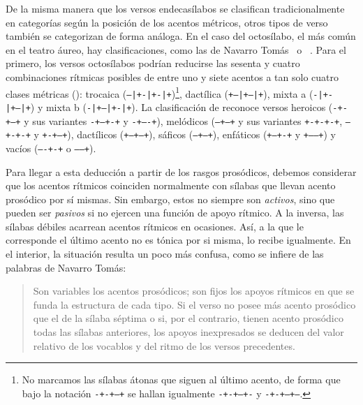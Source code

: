 De la misma manera que los versos endecasílabos se clasifican tradicionalmente en categorías según la posición de los acentos métricos, otros tipos de verso también se categorizan de forma análoga. En el caso del octosílabo, el más común en el teatro áureo, hay clasificaciones, como las de Navarro Tomás~\parencite*[64 y ss.]{navarrotomas2014a} o \citeauthor{varela2005}~\parencite*[149-158]{varela2005}. Para el primero, los versos octosílabos podrían reducirse las sesenta y cuatro combinaciones rítmicas posibles de entre uno y siete acentos a tan solo cuatro clases métricas (): trocaica (\texttt{--|+-|+-|+})\footnote{No marcamos las sílabas átonas que siguen al último acento, de forma que bajo la notación \texttt{-+-+--+} se hallan igualmente \texttt{-+-+--+-} y \texttt{-+-+--+--}.}, dactílica (\texttt{+--|+--|+}), mixta a (\texttt{-|+-|+--|+}) y mixta b (\texttt{-|+--|+-|+}). La clasificación de \citeauthor{varela2005} reconoce versos heroicos (\texttt{-+-+--+} y sus variantes \texttt{-+--+-+} y \texttt{-+----+}), melódicos  (\texttt{--+---+} y sus variantes \texttt{+-+-+-+}, \texttt{--+-+-+} y \texttt{+-+---+}), dactílicos (\texttt{+--+--+}), sáficos (\texttt{---+--+}), enfáticos (\texttt{+---+-+} y \texttt{+-----+}) y vacíos (\texttt{----+-+} o \texttt{------+}).




Para llegar a esta deducción a partir de los rasgos prosódicos, debemos considerar que los acentos rítmicos coinciden normalmente con sílabas que llevan acento prosódico por sí mismas. Sin embargo, estos no siempre son \textit{activos}, sino que pueden ser \textit{pasivos} si no ejercen una función de apoyo rítmico. A la inversa, las sílabas débiles acarrean acentos rítmicos en ocasiones. Así, a la que le corresponde el último acento no es tónica por si misma, lo recibe igualmente. En el interior, la situación resulta un poco más confusa, como se infiere de las palabras de Navarro Tomás:
\blockquote{Son variables los acentos prosódicos; son fijos los apoyos rítmicos en que se funda la estructura de cada tipo. Si el verso no posee más acento prosódico que el de la sílaba séptima o si, por el contrario, tienen acento prosódico todas las sílabas anteriores, los apoyos inexpresados se deducen del valor relativo de los vocablos y del ritmo de los versos precedentes. \parencite*[52]{navarrotomas2014a}}.

